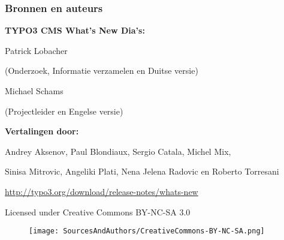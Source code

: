 \begin{frame}[fragile]
	\frametitle{Bronnen en auteurs}

	\vspace{-0.6cm}

	\centerline{\textbf{TYPO3 CMS What's New Dia's:}}

	\begin{center}
		\smaller
			\centerline{Patrick Lobacher}
			\centerline{(Onderzoek, Informatie verzamelen en Duitse versie)}
			\vspace{0.1cm}
			\centerline{Michael Schams}
			\centerline{(Projectleider en Engelse versie)}
		\normalsize
	\end{center}
	\vspace{-0.6cm}
	\begin{center}
		\smaller
			\centerline{\textbf{Vertalingen door:}}
			\centerline{Andrey Aksenov, Paul Blondiaux, Sergio Catala, Michel Mix,}
			\centerline{Sinisa Mitrovic, Angeliki Plati, Nena Jelena Radovic en Roberto Torresani}
		\normalsize
	\end{center}
	\vspace{-0.6cm}
	\smaller\begin{center}\url{http://typo3.org/download/release-notes/whats-new}\end{center}\normalsize

	\smaller\begin{center}Licensed under Creative Commons BY-NC-SA 3.0\end{center}\normalsize
	\begin{figure}\vspace*{-0.3cm}
		\texttt{[image: SourcesAndAuthors/CreativeCommons-BY-NC-SA.png]}
	\end{figure}

\end{frame}

